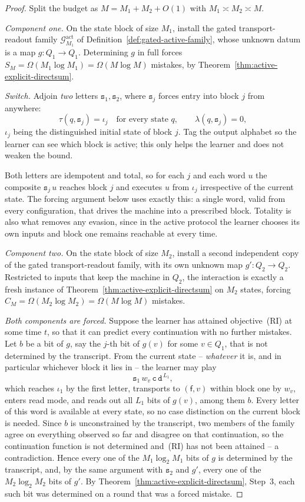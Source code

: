 \documentclass[12pt]{article}
\theoremstyle{definition}
\newcommand{\Gact}{\mathcal G^{\mathrm{act}}}
\newcommand{\free}{\mathsf f}
\begin{document}
\begin{proof}
Split the budget as $M=M_1+M_2+O(1)$ with $M_1\asymp M_2\asymp M$.

\emph{Component one.}  On the state block of size $M_1$, install the gated
transport-readout family $\Gact_{M_1}$ of
Definition~\ref{def:gated-active-family}, whose unknown datum is a map
$g:Q_1\to Q_1$.  Determining $g$ in full forces
$S_M=\Omega(M_1\log M_1)=\Omega(M\log M)$ mistakes, by
Theorem~\ref{thm:active-explicit-directsum}.

\emph{Switch.}  Adjoin \emph{two} letters $\mathtt s_1,\mathtt s_2$, where
$\mathtt s_j$ forces entry into block $j$ from anywhere:
\[
\tau(q,\mathtt s_j)=\iota_j
\quad\text{for every state }q,
\qquad
\lambda(q,\mathtt s_j)=0,
\]
$\iota_j$ being the distinguished initial state of block $j$.  Tag the output
alphabet so the learner can see which block is active; this only helps the
learner and does not weaken the bound.

Both letters are idempotent and total, so for each $j$ and each word $u$ the
composite $\mathtt s_j\,u$ reaches block $j$ and executes $u$ from $\iota_j$
irrespective of the current state.  The forcing argument below uses exactly
this: a single word, valid from every configuration, that drives the machine
into a prescribed block.  Totality is also what removes any evasion, since in
the active protocol the learner chooses its own inputs and block one remains
reachable at every time.

\emph{Component two.}  On the state block of size $M_2$, install a second
independent copy of the gated transport-readout family, with its own unknown
map $g':Q_2\to Q_2$.  Restricted to inputs that keep the machine in $Q_2$, the
interaction is exactly a fresh instance of
Theorem~\ref{thm:active-explicit-directsum} on $M_2$ states, forcing
$C_M=\Omega(M_2\log M_2)=\Omega(M\log M)$ mistakes.

\emph{Both components are forced.}  Suppose the learner has attained
objective~(RI) at some time $t$, so that it can predict every continuation with
no further mistakes.  Let $b$ be a bit of $g$, say the $j$-th bit of $g(v)$ for
some $v\in Q_1$, that is not determined by the transcript.  From the current
state -- \emph{whatever} it is, and in particular whichever block it lies in --
the learner may play
\[
\mathtt s_1\,w_v\,\mathtt c\,\mathtt d^{\,L_1},
\]
which reaches $\iota_1$ by the first letter, transports to $(\free,v)$ within
block one by $w_v$, enters read mode, and reads out all $L_1$ bits of $g(v)$,
among them $b$.  Every letter of this word is available at every state, so no
case distinction on the current block is needed.  Since $b$ is unconstrained
by the transcript, two members of the family agree on everything observed so
far and disagree on that continuation, so the continuation function is not
determined and~(RI) has not been attained -- a contradiction.  Hence every one
of the $M_1\log_2M_1$ bits of $g$ is determined by the transcript, and,
by the same argument with $\mathtt s_2$ and $g'$, every one of the
$M_2\log_2M_2$ bits of $g'$.  By
Theorem~\ref{thm:active-explicit-directsum}, Step~3, each such bit was
determined on a round that was a forced mistake.


\end{proof}
\end{document}
